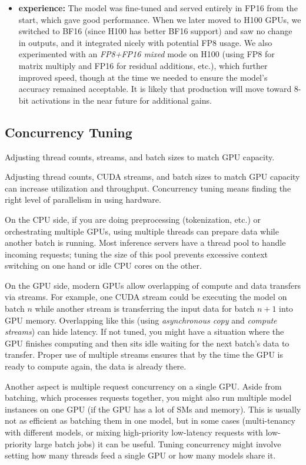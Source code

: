 \begin{tcolorbox}
\begin{itemize}
\item \textbf{\ishtar{} experience:} The model was fine-tuned and served entirely in FP16 from the start, which gave good performance. When we later moved to H100 GPUs, we switched to BF16 (since H100 has better BF16 support) and saw no change in outputs, and it integrated nicely with potential FP8 usage. We also experimented with an \emph{FP8+FP16 mixed} mode on H100 (using FP8 for matrix multiply and FP16 for residual additions, etc.), which further improved speed, though at the time we needed to ensure the model's accuracy remained acceptable. It is likely that production will move toward 8-bit activations in the near future for additional gains.
\end{itemize}
\end{tcolorbox}

\subsection{Concurrency Tuning}
Adjusting thread counts, streams, and batch sizes to match GPU capacity.

Adjusting thread counts, CUDA streams, and batch sizes to match GPU capacity can increase utilization and throughput. Concurrency tuning means finding the right level of parallelism in using hardware.

On the CPU side, if you are doing preprocessing (tokenization, etc.) or orchestrating multiple GPUs, using multiple threads can prepare data while another batch is running. Most inference servers have a thread pool to handle incoming requests; tuning the size of this pool prevents excessive context switching on one hand or idle CPU cores on the other.

On the GPU side, modern GPUs allow overlapping of compute and data transfers via streams. For example, one CUDA stream could be executing the model on batch $n$ while another stream is transferring the input data for batch $n{+}1$ into GPU memory. Overlapping like this (using \textit{asynchronous copy} and \textit{compute streams}) can hide latency. If not tuned, you might have a situation where the GPU finishes computing and then sits idle waiting for the next batch’s data to transfer. Proper use of multiple streams ensures that by the time the GPU is ready to compute again, the data is already there.

Another aspect is multiple request concurrency on a single GPU. Aside from batching, which processes requests together, you might also run multiple model instances on one GPU (if the GPU has a lot of SMs and memory). This is usually not as efficient as batching them in one model, but in some cases (multi-tenancy with different models, or mixing high-priority low-latency requests with low-priority large batch jobs) it can be useful. Tuning concurrency might involve setting how many threads feed a single GPU or how many models share it.

